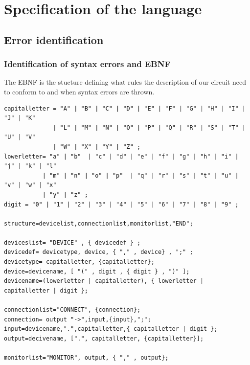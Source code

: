 \documentclass[a4paper,11pt]{article}
\numberwithin{equation}{section}
\begin{document}
\section{Specification of the language}
\subsection{Error identification}
\subsubsection{Identification of syntax errors and EBNF }
The EBNF is the stucture defining what rules the description of our circuit need to conform to and when syntax errors are thrown.

\begin{lstlisting}[caption= EBNF of the logic syntax,captionpos=b]
capitalletter = "A" | "B" | "C" | "D" | "E" | "F" | "G" | "H" | "I" | "J" | "K" 
		  	  | "L" | "M" | "N" | "O" | "P" | "Q" | "R" | "S" | "T" | "U" | "V" 
		  	  | "W" | "X" | "Y" | "Z" ;
lowerletter= "a" | "b"	| "c" | "d" | "e" | "f" | "g" | "h" | "i" | "j" | "k" | "l" 
		   | "m" | "n" | "o" | "p"	| "q" | "r" | "s" | "t" | "u" | "v" | "w" | "x" 
		   | "y" | "z" ;
digit = "0" | "1" | "2" | "3" | "4" | "5" | "6" | "7" | "8" | "9" ;

structure=devicelist,connectionlist,monitorlist,"END";

deviceslist= "DEVICE" , { devicedef } ;
devicedef= devicetype, device, { "," , device} , ";" ;
devicetype= capitalletter, {capitalletter};
device=devicename, [ "(" , digit , { digit } , ")" ];
devicename=(lowerletter | capitalletter), { lowerletter | capitalletter | digit };

connectionlist="CONNECT", {connection};
connection= output "->",input,{input},";";
input=devicename,".",capitalletter,{ capitalletter | digit };  
output=decivename, [".", capitalletter, {capitalletter}];

monitorlist="MONITOR", output, { "," , output};
\end{lstlisting}
\end{document}
